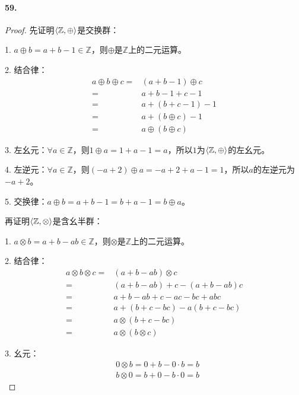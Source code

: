 \documentclass[12pt, a4paper, oneside]{ctexart}
\begin{document}
\paragraph{59.}\begin{proof}
    先证明$\braket{\mathbb{Z}, \oplus}$是交换群：

    1. $a\oplus b = a+b-1\in \mathbb{Z}$，则$\oplus$是$\mathbb{Z}$上的二元运算。

    2. 结合律：
    \begin{equation*}
        \begin{aligned}
            a\oplus b\oplus c =& (a+b-1)\oplus c\\
             =& a+b-1+c-1 \\
             =& a+(b+c-1)-1 \\
             =& a + (b\oplus c) - 1 \\
             =& a\oplus(b\oplus c)
        \end{aligned}
    \end{equation*}

    3. 左幺元：$\forall a\in \mathbb{Z}$，则$1\oplus a = 1+a-1 = a$，所以$1$为$\braket{\mathbb{Z},\oplus}$的左幺元。

    4. 左逆元：$\forall a\in \mathbb{Z}$，则$(-a+2)\oplus a = -a+2+a-1 = 1$，所以$a$的左逆元为$-a+2$。

    5. 交换律：$a\oplus b = a+b-1 = b+a-1 = b\oplus a$。

    再证明$\braket{\mathbb{Z},\otimes}$是含幺半群：

    1. $a\otimes b = a+b-ab\in \mathbb{Z}$，则$\otimes$是$\mathbb{Z}$上的二元运算。
    
    2. 结合律：
    \begin{equation*}
        \begin{aligned}
            a\otimes b\otimes c = & (a+b-ab)\otimes c\\
            = & (a+b-ab)+c-(a+b-ab)c\\
            = & a+b-ab + c-ac-bc+abc\\
            = & a+(b+c-bc)-a(b+c-bc)\\
            = & a\otimes (b+c-bc)\\
            = & a\otimes (b\otimes c)
        \end{aligned}
    \end{equation*}

    3. 幺元：
    \begin{equation*}
        \begin{aligned}
            &0\otimes b = 0+b-0\cdot b = b\\
            &b\otimes 0 = b + 0 - b\cdot 0 = b
        \end{aligned}
    \end{equation*}


\end{proof}
\end{document}
